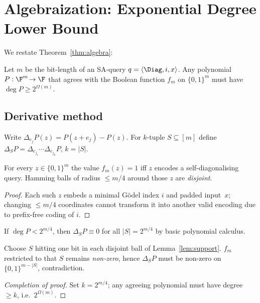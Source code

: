 \section{Algebraization: Exponential Degree Lower Bound}

We restate Theorem~\ref{thm:algebra}:

\begin{theorem*}
Let $m$ be the bit-length of an SA-query
$q=\langle\Diag,i,x\rangle$.  
Any polynomial $P:\F^m\!\to\F$ that agrees with
the Boolean function $f_m$ on $\{0,1\}^m$
must have $\deg P \ge 2^{\Omega(m)}$.
\end{theorem*}

\subsection{Derivative method}

Write $\Delta_{e_j}P(z)=P(z+e_j)-P(z)$.
For $k$-tuple $S\subseteq[m]$ define
$\Delta_S P = \Delta_{e_{j_1}}\cdots\Delta_{e_{j_k}}P$,
$k=|S|$.

\begin{lemma}\label{lem:support}
For every $z\in\{0,1\}^m$ the value $f_m(z)=1$
iff $z$ encodes a self-diagonalising query.
Hamming balls of radius $\le m/4$ around those $z$
are \emph{disjoint}.
\end{lemma}

\begin{proof}
Each such $z$ embeds a minimal Gödel index $i$
and padded input~$x$;
changing $\le m/4$ coordinates
cannot transform it into another valid encoding
due to prefix-free coding of $i$.
\end{proof}

\begin{lemma}\label{lem:derivative}
If $\deg P < 2^{m/4}$, 
then $\Delta_S P \equiv 0$ for all $|S|=2^{m/4}$
by basic polynomial calculus.
\end{lemma}

Choose $S$ hitting one bit in each disjoint
ball of Lemma~\ref{lem:support}.
$f_m$ restricted to that $S$ remains
\emph{non-zero}, hence
$\Delta_S P$ must be non-zero on $\{0,1\}^{m-|S|}$,
contradiction.

\begin{proof}[Completion of proof]
Set $k=2^{m/4}$; any agreeing polynomial
must have degree $\ge k$, i.e.\ 
$2^{\Omega(m)}$.
\end{proof}
